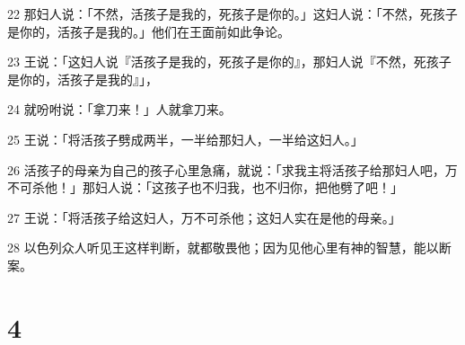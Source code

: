 \par 22 那妇人说：「不然，活孩子是我的，死孩子是你的。」这妇人说：「不然，死孩子是你的，活孩子是我的。」他们在王面前如此争论。
\par 23 王说：「这妇人说『活孩子是我的，死孩子是你的』，那妇人说『不然，死孩子是你的，活孩子是我的』」，
\par 24 就吩咐说：「拿刀来！」人就拿刀来。
\par 25 王说：「将活孩子劈成两半，一半给那妇人，一半给这妇人。」
\par 26 活孩子的母亲为自己的孩子心里急痛，就说：「求我主将活孩子给那妇人吧，万不可杀他！」那妇人说：「这孩子也不归我，也不归你，把他劈了吧！」
\par 27 王说：「将活孩子给这妇人，万不可杀他；这妇人实在是他的母亲。」
\par 28 以色列众人听见王这样判断，就都敬畏他；因为见他心里有神的智慧，能以断案。

\chapter{4}

